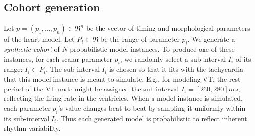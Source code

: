 
\subsection{Cohort generation}
\label{sec:cohort generation}
Let $p = (p_1,\ldots,p_n) \in \Re^n$ be the vector of timing and morphological parameters of the heart model.
Let $P_i \subset \Re$ be the range of parameter $p_i$.
We generate a \emph{synthetic cohort} of $N$ probabilistic model instances.
To produce one of these instances, for each scalar parameter $p_i$, we randomly select a sub-interval $I_i$ of its range: $I_i \subset P_i$.
The sub-interval $I_i$ is chosen so that it fits with the tachycardia that this model instance is meant to simulate.
E.g., for modeling \ac{VT}, the rest period of the \ac{VT} node might be assigned the sub-interval $I_i = [260, 280]ms$, reflecting the firing rate in the ventricles.
When a model instance is simulated, each parameter $p_i$'s value changes beat to beat by sampling it uniformly within its sub-interval $I_i$.
Thus each generated model is probabilistic to reflect inherent rhythm variability.